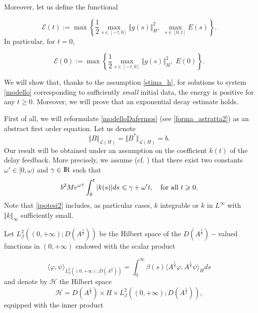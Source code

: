 \documentclass[11pt]{article}
\newcommand{\RR}{{{\rm I} \kern -.15em {\rm R} }}
\renewcommand{\ge}{\geqslant}
\renewcommand{\leq}{\leqslant}
\begin{document}
Moreover, let us define the functional 

$$\mathcal{E}(t):=\max\left\{\frac{1}{2}\max_{s\in [-\bar{\tau},0]}\Vert g(s)\Vert_H^2,\,\,\max_{s\in[0,t]}E(s)\right\}.$$ 
In particular, for $t=0$, 

$$\mathcal{E}(0):=\max\left\{\frac{1}{2}\max_{s\in [-\bar{\tau},0]}\Vert g(s)\Vert_H^2,\,\,E(0)\right\}.$$ 

We will show that, thanks to the assumption  \eqref{stima_h}, for solutions to system \eqref{modello} corresponding to sufficiently {\em small} initial data, the energy is positive for any $t\ge 0.$ Moreover, we will prove that an exponential decay estimate holds.

First of all, we will reformulate \eqref{modelloDafermos} (see \eqref{forma_astratta2}) as an abstract first order equation. 
Let us denote
\begin{equation}\label{b}
\Vert B\Vert_{\mathcal{L}(H)}=\Vert B^*\Vert_{\mathcal{L}(H)}=b.
\end{equation}
Our result will be obtained under an assumption on the coefficient $k(t)$ of the delay feedback.
More precisely, we assume (cf. \cite{KP}) that
there exist two constants $\omega '\in [0,\omega)$ and $\gamma\in \RR$ such that
\begin{equation}
\label{ipotesi2}
b^2 Me^{\omega\bar\tau} \int_0^t  |k(s)| ds \leq \gamma +\omega 't, \quad \mbox{\rm for all}\ t\ge 0.
\end{equation}
Note that \eqref{ipotesi2} includes, as particular cases,  $k$ integrable or $k$ in $L^\infty$ with $\Vert k\Vert_\infty$ sufficiently small.


Let $L^2_\beta ((0,+\infty); D(A^{\frac 12}))$ be the Hilbert space of the $D(A^{\frac 12})-$valued functions in $(0,+\infty)$ endowed with the scalar product

$$\langle \varphi, \psi \rangle_{L^2_\beta ((0,+\infty); D(A^{\frac 12}))}=\int_0^\infty \beta (s)\langle A^{\frac 12}\varphi, A^{\frac 12}\psi \rangle_H ds$$
and denote by ${\mathcal H }$ the Hilbert space
$$
\mathcal{H}=D(A^{\frac 12})\times H\times  L^2_{\beta} ((0,+\infty);D(A^{\frac 12})),
$$
equipped with the inner product
\end{document}
